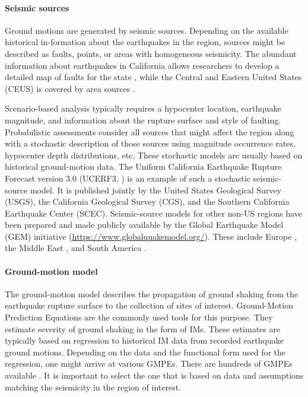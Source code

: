 \paragraph{Seismic sources} Ground motions are generated by seismic sources. Depending on the available historical in-formation about the earthquakes in the region, sources might be described as faults, points, or areas with homogeneous seismicity. The abundant information about earthquakes in California allows researchers to develop a detailed map of faults for the state \citep{field2014uniform}, while the Central and Eastern United States (CEUS) is covered by area sources \citep{mueller2015seismic}.

Scenario-based analysis typically requires a hypocenter location, earthquake magnitude, and information about the rupture surface and style of faulting. Probabilistic assessments consider all sources that might affect the region along with a stochastic description of those sources using magnitude occurrence rates, hypocenter depth distributions, etc. These stochastic models are usually based on historical ground-motion data. The Uniform California Earthquake Rupture Forecast version 3.0 (UCERF3, \cite{field2014uniform}) is an example of such a stochastic seismic-source model. It is published jointly by the United States Geological Survey (USGS), the California Geological Survey (CGS), and the Southern California Earthquake Center (SCEC). Seismic-source models for other non-US regions have been prepared and made publicly available by the Global Earthquake Model (GEM) initiative (\url{https://www.globalquakemodel.org/}). These include Europe \citep{giardini2014mapping}, the Middle East \citep{danciu20172014}, and South America \citep{garcia2018creation}.

\paragraph{Ground-motion model} The ground-motion model describes the propagation of ground shaking from the earthquake rupture surface to the collection of sites of interest. Ground-Motion Prediction Equations are the commonly used tools for this purpose. They estimate severity of ground shaking in the form of IMs. These estimates are typically based on regression to historical IM data from recorded earthquake ground motions. Depending on the data and the functional form used for the regression, one might arrive at various GMPEs. There are hundreds of GMPEs available \citep{douglas2018ground}. It is important to select the one that is based on data and assumptions matching the seismicity in the region of interest.

